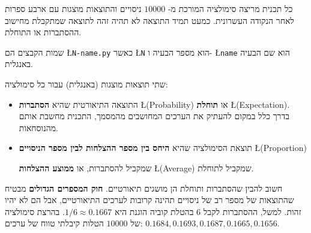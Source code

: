 כל תכנית מריצה סימולציה המורכת מ-%
$10000$
ניסויים והתוצאות מוצגות עם ארבע ספרות לאחר הנקודה העשרונית. כמעט תמיד התוצאה לא תהיה זהה לתוצאה שמתקבלת מחישוב ההסתברות או התוחלת. 

שמות הקבצים הם 
\L{\texttt{N-name.py}}
כאשר
\L{\texttt{N}}
הוא מספר הבעיה ו-%
\L{\texttt{name}}
הוא שם הבעיה באנגלית.

שתי תוצאות מוצגות (באנגלית) עבור כל סימולציה:
\begin{itemize}
\item
התוצאה התיאורטית שהיא 
\textbf{הסתברות}
\L{(Probability)}
או
\textbf{תוחלת}
\L{(Expectation)}.
בדרך כלל במקום להעתיק את הערכים המחושבים מהמסמך, התכנית מחשבת אותם מהנוסחאות.
\item
תוצאת הסימולציה שהיא
\textbf{היחס בין מספר ההצלחות לבין מספר הניסויים}
\L{(Proportion)}

שמקביל להסתברות, או
\textbf{ממוצע ההצלחות}
\L{(Average)}
שמקביל לתוחלת.
\end{itemize}
חשוב להבין שהסתברות ותוחלת הן מושגים תיאורטיים. 
\textbf{חוק המספרים הגדולים}
מבטיח שהתוצאות של מספר רב של ניסויים תהינה קרובות לערכים התיאורטיים, אבל הם לא יהיו זהות. למשל, ההסתברות לקבל 
$6$
בהטלת קוביה הוגנת היא
$1/6\approx 0.1667$.
בהרצת סימולציה של 
$10000$
הטלות קיבלתי טווח של ערכים:
$0.1684, 0.1693, 0.1687, 0.1665, 0.1656$.
